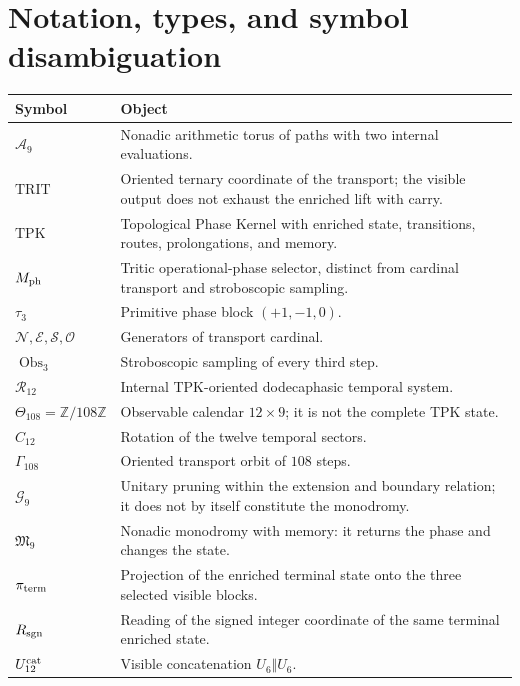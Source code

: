 \chapter*{Notation, types, and symbol disambiguation}

\begin{longtable}{@{}p{}p{}@{}}
\toprule
Symbol & Object \\ \midrule
\endhead
\(\mathcal A_9\)&Nonadic arithmetic torus of paths with two internal evaluations.\\
\(\mathrm{TRIT}\)&Oriented ternary coordinate of the transport; the visible
output does not exhaust the enriched lift with carry.\\
\(\mathrm{TPK}\)&Topological Phase Kernel with enriched state,
transitions, routes, prolongations, and memory.\\
\(M_{\rm ph}\)&Tritic operational-phase selector, distinct from cardinal
transport and stroboscopic sampling.\\
\(\tau_3\)&Primitive phase block \((+1,-1,0)\).\\
\(\mathcal N,\mathcal E,\mathcal S,\mathcal O\)&Generators of transport
cardinal.\\
\(\operatorname{Obs}_3\)&Stroboscopic sampling of every third step.\\
\(\mathcal R_{12}\)&Internal TPK-oriented dodecaphasic temporal system.\\
\(\Theta_{108}=\mathbb Z/108\mathbb Z\)&Observable calendar
\(12\times9\); it is not the complete TPK state.\\
\(C_{12}\)&Rotation of the twelve temporal sectors.\\
\(\Gamma_{108}\)&Oriented transport orbit of \(108\) steps.\\
\(\mathcal G_9\)&Unitary pruning within the extension and
boundary relation; it does not by itself constitute the monodromy.\\
\(\mathfrak M_9\)&Nonadic monodromy with memory: it returns the phase and changes
the state.\\
\(\pi_{\rm term}\)&Projection of the enriched terminal state onto the three selected visible blocks.\\
\(R_{\rm sgn}\)&Reading of the signed integer coordinate of the same terminal enriched state.\\
\(U_{12}^{\rm cat}\)&Visible concatenation \(U_6\Vert U_6\).\\

\end{longtable}
